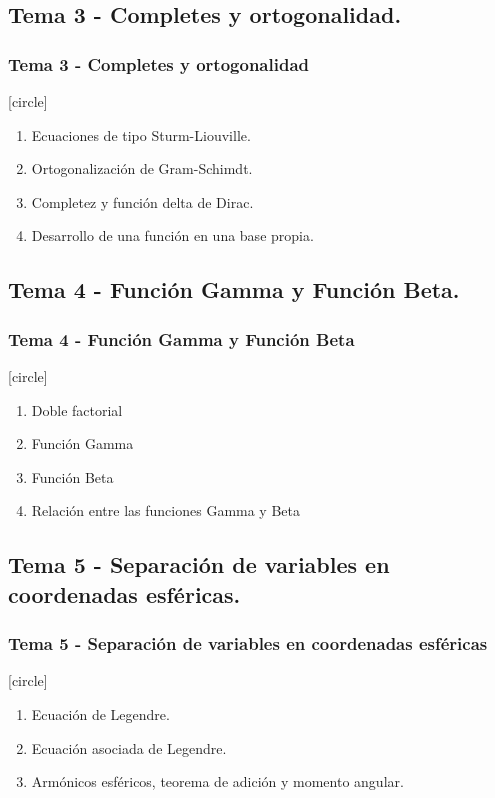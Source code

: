 \subsection{Tema 3 - Completes y ortogonalidad.}
\begin{frame}
\frametitle{Tema 3 - Completes y ortogonalidad}
[circle]
\begin{enumerate}[<+->]
\item Ecuaciones de tipo Sturm-Liouville.
\item Ortogonalización de Gram-Schimdt.
\item Completez y función delta de Dirac.
\item Desarrollo de una función en una base propia.    
\end{enumerate}
\end{frame}
\subsection{Tema 4 - Función Gamma y Función Beta.}
\begin{frame}
\frametitle{Tema 4 - Función Gamma y Función Beta}
[circle]
\begin{enumerate}[<+->]
\item Doble factorial
\item Función Gamma
\item Función Beta
\item Relación entre las funciones Gamma y Beta
\end{enumerate}
\end{frame}
\subsection{Tema 5 - Separación de variables en coordenadas esféricas.}
\begin{frame}
\frametitle{Tema 5 - Separación de variables en coordenadas esféricas}
[circle]
\begin{enumerate}[<+->]
\item Ecuación de Legendre.
\item Ecuación asociada de Legendre.
\item Armónicos esféricos, teorema de adición y momento angular.
\end{enumerate}
\end{frame}

